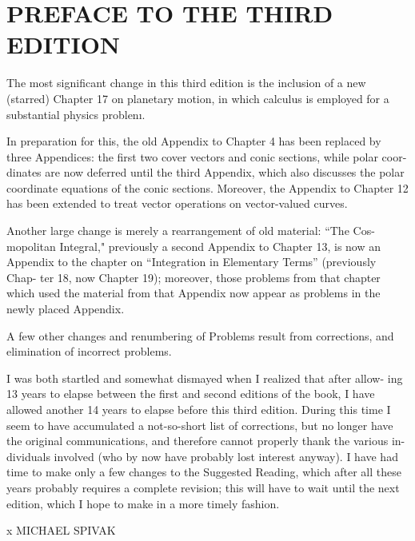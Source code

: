 \section*{PREFACE TO THE THIRD EDITION}

The most significant change in this third edition is the inclusion of a new (starred)
Chapter 17 on planetary motion, in which calculus is employed for a substantial
physics problenı.

In preparation for this, the old Appendix to Chapter 4 has been replaced by
three Appendices: the first two cover vectors and conic sections, while polar coor-
dinates are now deferred until the third Appendix, which also discusses the polar
coordinate equations of the conic sections. Moreover, the Appendix to Chapter 12
has been extended to treat vector operations on vector-valued curves.

Another large change is merely a rearrangement of old material: “The Cos-
mopolitan Integral," previously a second Appendix to Chapter 13, is now an
Appendix to the chapter on “Integration in Elementary Terms” (previously Chap-
ter 18, now Chapter 19); moreover, those problems from that chapter which used
the material from that Appendix now appear as problems in the newly placed
Appendix.

A few other changes and renumbering of Problems result from corrections, and
elimination of incorrect problems.

I was both startled and somewhat dismayed when I realized that after allow-
ing 13 years to elapse between the first and second editions of the book, I have
allowed another 14 years to elapse before this third edition. During this time I
seem to have accumulated a not-so-short list of corrections, but no longer have
the original communications, and therefore cannot properly thank the various in-
dividuals involved (who by now have probably lost interest anyway). I have had
time to make only a few changes to the Suggested Reading, which after all these
years probably requires a complete revision; this will have to wait until the next
edition, which I hope to make in a more timely fashion.

x
\hfill MICHAEL SPIVAK